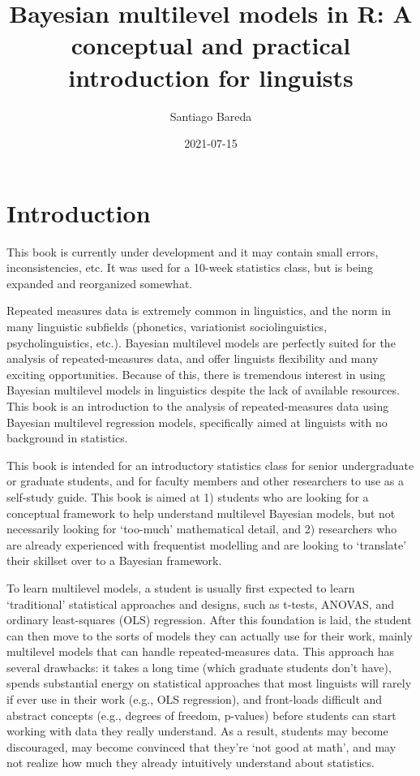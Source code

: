 \documentclass[
]{book}
\title{Bayesian multilevel models in R: A conceptual and practical introduction for linguists}
\author{Santiago Bareda}
\date{2021-07-15}
\begin{document}
\maketitle

{
\setcounter{tocdepth}{1}
\tableofcontents
}
\hypertarget{introduction}{%
\chapter*{Introduction}\label{introduction}}

This book is currently under development and it may contain small errors, inconsistencies, etc. It was used for a 10-week statistics class, but is being expanded and reorganized somewhat.

Repeated measures data is extremely common in linguistics, and the norm in many linguistic subfields (phonetics, variationist sociolinguistics, psycholinguistics, etc.). Bayesian multilevel models are perfectly suited for the analysis of repeated-measures data, and offer linguists flexibility and many exciting opportunities. Because of this, there is tremendous interest in using Bayesian multilevel models in linguistics despite the lack of available resources. This book is an introduction to the analysis of repeated-measures data using Bayesian multilevel regression models, specifically aimed at linguists with no background in statistics.

This book is intended for an introductory statistics class for senior undergraduate or graduate students, and for faculty members and other researchers to use as a self-study guide. This book is aimed at 1) students who are looking for a conceptual framework to help understand multilevel Bayesian models, but not necessarily looking for `too-much' mathematical detail, and 2) researchers who are already experienced with frequentist modelling and are looking to `translate' their skillset over to a Bayesian framework.

To learn multilevel models, a student is usually first expected to learn `traditional' statistical approaches and designs, such as t-tests, ANOVAS, and ordinary least-squares (OLS) regression. After this foundation is laid, the student can then move to the sorts of models they can actually use for their work, mainly multilevel models that can handle repeated-measures data. This approach has several drawbacks: it takes a long time (which graduate students don't have), spends substantial energy on statistical approaches that most linguists will rarely if ever use in their work (e.g., OLS regression), and front-loads difficult and abstract concepts (e.g., degrees of freedom, p-values) before students can start working with data they really understand. As a result, students may become discouraged, may become convinced that they're `not good at math', and may not realize how much they already intuitively understand about statistics.
\end{document}
